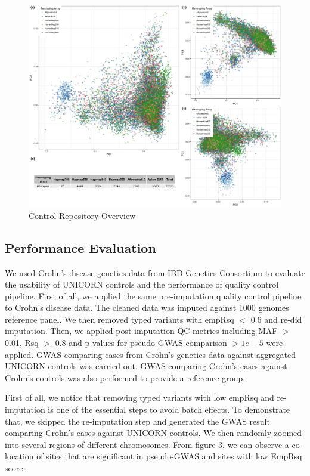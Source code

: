\documentclass[12pt]{amsart}
\begin{document}
\begin{figure}[H]
    \centering
    \includegraphics[width=\textwidth]{qc/contRepoPCA.jpg}
    \caption{Control Repository Overview}
    \label{fig:cont_repo}
\end{figure}

\subsection{Performance Evaluation}
We used Crohn's disease genetics data from IBD Genetics Consortium to evaluate the usability of UNICORN controls and the performance of quality control pipeline. First of all, we applied the same pre-imputation quality control pipeline to Crohn's disease data. The cleaned data was imputed against 1000 genomes reference panel. We then removed typed variants with empRsq $<$ 0.6 and re-did imputation. Then, we applied post-imputation QC metrics including MAF $>$ 0.01, Rsq $>$ 0.8 and p-values for pseudo GWAS comparison $> 1e-5$ were applied. GWAS comparing cases from Crohn's genetics data against aggregated UNICORN controls was carried out. GWAS comparing Crohn's cases against Crohn's controls was also performed to provide a reference group. 

First of all, we notice that removing typed variants with low empRsq and re-imputation is one of the essential steps to avoid batch effects. To demonstrate that, we skipped the re-imputation step and generated the GWAS result comparing Crohn's cases against UNICORN controls. We then randomly zoomed-into several regions of different chromosomes. From figure 3, we can observe a co-location of sites that are significant in pseudo-GWAS and sites with low EmpRsq score. 
\end{document}
